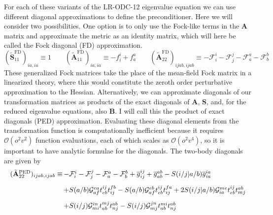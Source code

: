 For each of these variants of the LR-ODC-12 eigenvalue equation we can use
different diagonal approximations to define the preconditioner.
Here we will consider two possibilities.
One option is to only use the Fock-like terms in the \(\mathbf{A}\) matrix and
approximate the metric as an identity matrix, which will here be called the Fock
diagonal (FD) approximation.
\begin{equation}
    (\tilde{\mathbf{S}}_{11}^\mathrm{FD})_{ia,ia}
    \equiv
    1
    \qquad
    (\tilde{\mathbf{A}}_{11}^\mathrm{FD})_{ia,ia}
    \equiv
    -
    f_i^i
    +
    f_a^a
    \qquad
    (\tilde{\mathbf{A}}_{22}^\mathrm{FD})_{ijab,ijab}
    \equiv
    -
    \mathcal{F}_i^i
    -
    \mathcal{F}_j^j
    -
    \mathcal{F}_a^a
    -
    \mathcal{F}_b^b
\end{equation}
These generalized Fock matrices take the place of the mean-field Fock matrix in
a linearized theory, where this would constitute the zeroth order perturbative
approximation to the Hessian.
Alternatively, we can approximate diagonals of our transformation matrices as
products of the exact diagonals of \(\mathbf{A}\), \(\mathbf{S}\), and, for the
reduced eigenvalue equations, also \(\mathbf{B}\).
I will call this the product of exact diagonals (PED) approximation.
Evaluating these diagonal elements from the transformation function is
computationally inefficient because it requires \(\mathcal{O}(o^2v^2)\) function
evaluations, each of which scales as \(\mathcal{O}(o^2v^4)\), so it is important
to have analytic formulae for the diagonals.
The two-body diagonals are given by
\begin{equation}
    \begin{array}{r@{\,}l}
        (\tilde{\mathbf{A}}_{22}^\mathrm{PED})_{ijab,ijab}
        \equiv
        &
        -
        \mathcal{F}_i^i
        -
        \mathcal{F}_j^j
        -
        \mathcal{F}_a^a
        -
        \mathcal{F}_b^b
        +
        \overline{g}_{ij}^{ij}
        +
        \overline{g}_{ab}^{ab}
        -
        S(i/j|a/b)
        \overline{g}_{ia}^{ia}
        \\[10pt]
        &
        +
        S(a/b)
        \mathcal{G}_{af}^{ea}
        t_{eb}^{ij}
        t_{ij}^{fb}
        -
        S(a/b)
        \mathcal{G}_{af}^{eb}
        t_{eb}^{ij}
        t_{ij}^{fa}
        +
        2
        S(i/j|a/b)
        \mathcal{G}_{ia}^{me}
        t_{eb}^{ij}
        t_{mj}^{ab}
        \\[10pt]
        &
        +
        S(i/j)
        \mathcal{G}_{mi}^{in}
        t_{ab}^{mj}
        t_{nj}^{ab}
        -
        S(i/j)
        \mathcal{G}_{mj}^{jn}
        t_{ab}^{mi}
        t_{nj}^{ab}
    \end{array}
\end{equation}
